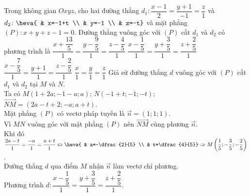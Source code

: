 \begin{ex}%
	Trong không gian $Oxyz$, cho hai đường thẳng $d_1\colon \dfrac{x-1}{2}=\dfrac{y+1}{-1}=\dfrac{z}{1}$ và $d_2\colon \heva{ & x=-1+t \\ & y=-1 \\ & z=-t}$ và mặt phẳng $(P)\colon x+y+z-1=0$. Đường thẳng vuông góc với $(P)$ cắt $d_1$ và $d_2$ có phương trình là
	\choice
	{$\dfrac{x+\dfrac{13}{5}}{1}=\dfrac{y-\dfrac{9}{5}}{1}=\dfrac{z-\dfrac{4}{5}}{1}$}
	{\True $\dfrac{x-\dfrac{1}{5}}{1}=\dfrac{y+\dfrac{3}{5}}{1}=\dfrac{z+\dfrac{2}{5}}{1}$}
	{$\dfrac{x-\dfrac{7}{5}}{1}=\dfrac{y+1}{1}=\dfrac{z-\dfrac{2}{5}}{1}$}
	{$\dfrac{x}{1}=\dfrac{y}{1}=\dfrac{z}{1}$}
	\loigiai
	{
		Giả sử đường thẳng $d$ vuông góc với $(P)$ cắt $d_1$ và $d_2$ tại $M$ và $N$.\\
		Ta có $M(1+2a;-1-a;a)$; $N(-1+t;-1;-t)$; $\overrightarrow{NM}=(2a-t+2;-a;a+t)$.\\
		Mặt phẳng $(P)$ có vectơ pháp tuyến là $\overrightarrow{n}=(1;1;1)$.\\
		Vì $MN$ vuông góc với mặt phẳng $(P)$ nên $\overrightarrow{NM}$ cùng phương $\overrightarrow{n}$.\\
		Khi đó $\dfrac{2a-t}{1}=\dfrac{-a}{1}=\dfrac{a+t}{1} \Leftrightarrow \heva{ & a=-\dfrac{2}{5} \\ & t=\dfrac{4}{5}} \Rightarrow M\left(\dfrac{1}{5};-\dfrac{3}{5};-\dfrac{2}{5}\right)$.\\
		Đường thẳng $d$ qua điểm $M$ nhận $\overrightarrow{n}$ làm vectơ chỉ phương.\\
		Phương trình $d\colon \dfrac{x-\dfrac{1}{5}}{1}=\dfrac{y+\dfrac{3}{5}}{1}=\dfrac{z+\dfrac{2}{5}}{1}$.
	}
\end{ex}

